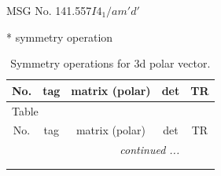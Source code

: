 \documentclass[fleqn,8pt]{jsarticle}
\begin{document}
\setcounter{MaxMatrixCols}{32}

\renewcommand{\tablename}{Table~}
\renewcommand{\figurename}{Figure~}
\begin{center}
\LARGE
MSG No. 141.557\quad$I4_{1}/am'd'$
\end{center}
* symmetry operation
\renewcommand{\arraystretch}{1.3}
\begin{longtable}{ccccc}
\caption{Symmetry operations for 3d polar vector.}
 \\
 \hline \hline
No. & tag & matrix (polar) & det & TR \\ \hline \endfirsthead

\multicolumn{4}{l}{\tablename\ \thetable{}} \\
 \hline \hline
No. & tag & matrix (polar) & det & TR \\ \hline \endhead

 \hline \hline
\multicolumn{4}{r}{\footnotesize\it continued ...} \\ \endfoot

 \hline \hline
\multicolumn{4}{r}{} \\ \endlastfoot


\end{longtable}
\end{document}
